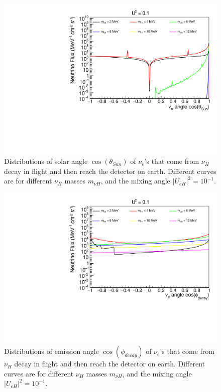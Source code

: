 \documentclass[%
 reprint,
 amsmath,amssymb,
 aps,
 prd,
floatfix,
twocolumn,
]{revtex4-1}
\begin{document}
\begin{figure}[!htbp]
\includegraphics[width=0.99\columnwidth]{../plots/DecayInFlightNuLCosthetaSun_U0.1_AllMass_linXlogY.pdf}
\caption{Distributions of solar angle $\cos(\theta_{Sun})$ of $\nu_e$'s that come from $\nu_H$ decay in flight and then reach the detector on earth. Different curves are for different $\nu_H$ masses $m_{\nu H}$, and the mixing angle $|U_{eH}|^2 = 10^{-1}$.}
\label{fig:DecayInFlightTheta_U1em1_AllMass}
\end{figure}

\begin{figure}[!htbp]
\includegraphics[width=0.99\columnwidth]{../plots/DecayInFlightNuLCosphiSun_U0.1_AllMass_linXlogY.pdf}
\caption{Distributions of emission angle $\cos(\phi_{decay})$ of $\nu_e$'s that come from $\nu_H$ decay in flight and then reach the detector on earth. Different curves are for different $\nu_H$ masses $m_{\nu H}$, and the mixing angle $|U_{eH}|^2 = 10^{-1}$.}
\label{fig:DecayInFlightPhi_U1em1_AllMass}
\end{figure}
\end{document}
